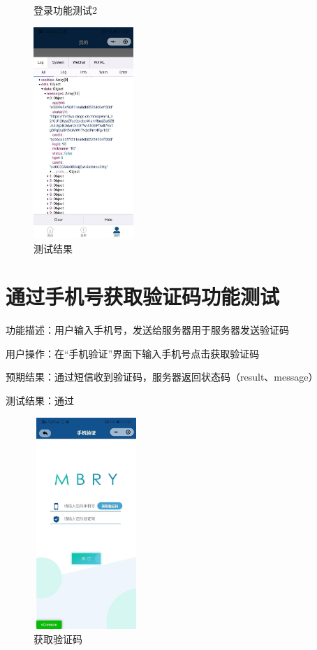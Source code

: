 \begin{figure}[htbp]
\begin{minipage}[t]{0.32\textwidth}
    \caption{登录功能测试2}
    \end{minipage}
    \begin{minipage}[t]{0.32\textwidth}
        \centering
        \includegraphics[width=3.8cm,height=8cm]{test/image/test3.png}
        \caption{测试结果}
        \end{minipage}
    \end{figure}

\section{通过手机号获取验证码功能测试}

功能描述：用户输入手机号，发送给服务器用于服务器发送验证码

用户操作：在“手机验证”界面下输入手机号点击获取验证码

预期结果：通过短信收到验证码，服务器返回状态码（result、message）

测试结果：通过

\newpage
\begin{figure}[htbp]
    \centering
    \begin{minipage}[t]{0.48\textwidth}
    \centering
    \includegraphics[width=4cm,height=8cm]{test/image/test4.png} 
    \caption{获取验证码}
    \end{minipage}
    \end{figure}
 
